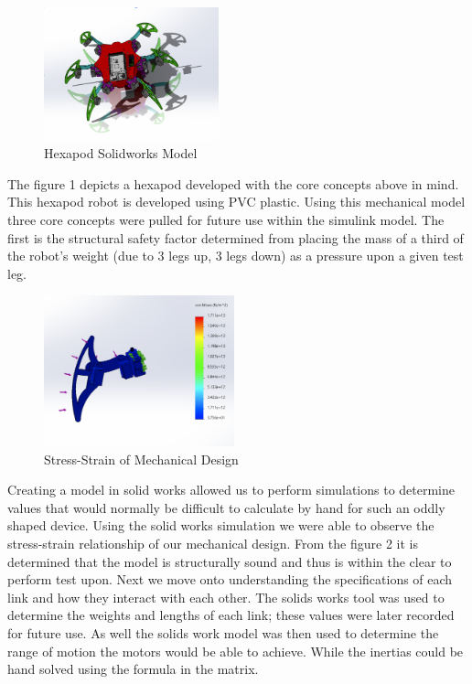 \begin{figure}[h]
 \centering
   \includegraphics[width = 0.45\textwidth]{figures/3.png}                \caption{Hexapod Solidworks Model}
   \label{fig:Physical Model }
\end{figure}

The figure 1 depicts a hexapod developed with the core concepts above in mind. This hexapod robot is developed using PVC plastic. Using this mechanical model three core concepts were pulled for future use within the simulink model. The first is the structural safety factor determined from placing the mass of a third of the robot's weight (due to 3 legs up, 3 legs down) as a pressure upon a given test leg. 

\begin{figure}[h]
 \centering
   \includegraphics[width = 0.49\textwidth]{figures/4.png}                \caption{Stress-Strain of Mechanical Design}
   \label{fig:Stress-Strain of Mechanical Design}
\end{figure}

Creating a model in solid works allowed us to perform simulations to determine values that would normally be difficult to calculate by hand for such an oddly shaped device. Using the solid works simulation we were able to observe the stress-strain relationship of our mechanical design.
From the figure 2 it is determined that the model is structurally sound and thus is within the clear to perform test upon. Next we move onto understanding the specifications of each link and how they interact with each other. The solids works tool was used to determine the weights and lengths of each link; these values were later recorded for future use. As well the solids work model was then used to determine the range of motion the motors would be able to achieve. While the inertias could be hand solved using the formula in the matrix.\\

